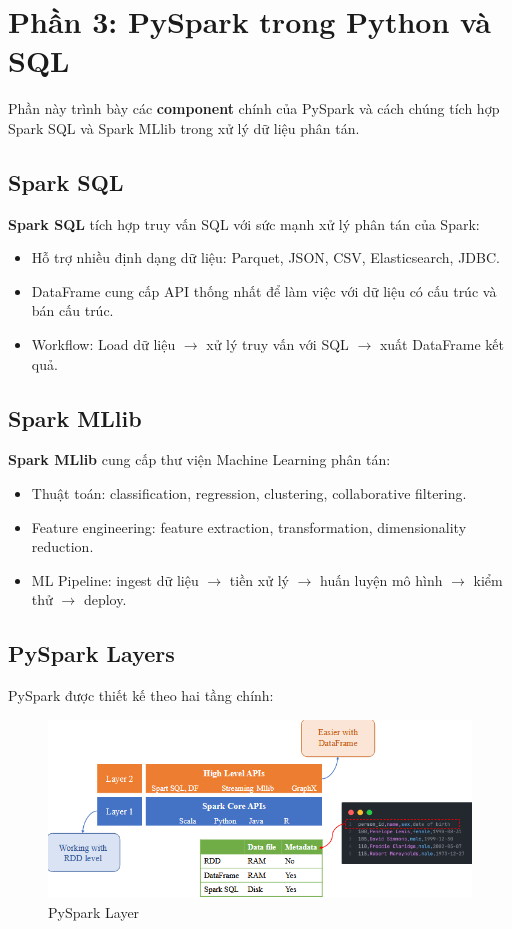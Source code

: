 \documentclass[11pt]{article}
\begin{document}
\section{Phần 3: PySpark trong Python và SQL}
Phần này trình bày các \textbf{component} chính của PySpark và cách chúng tích hợp Spark SQL và Spark MLlib trong xử lý dữ liệu phân tán.

\subsection{Spark SQL}
\textbf{Spark SQL} tích hợp truy vấn SQL với sức mạnh xử lý phân tán của Spark:
\begin{itemize}
    \item Hỗ trợ nhiều định dạng dữ liệu: Parquet, JSON, CSV, Elasticsearch, JDBC.
    \item DataFrame cung cấp API thống nhất để làm việc với dữ liệu có cấu trúc và bán cấu trúc.
    \item Workflow: Load dữ liệu $\rightarrow$ xử lý truy vấn với SQL $\rightarrow$ xuất DataFrame kết quả.
\end{itemize}

\subsection{Spark MLlib}
\textbf{Spark MLlib} cung cấp thư viện Machine Learning phân tán:
\begin{itemize}
    \item Thuật toán: classification, regression, clustering, collaborative filtering.
    \item Feature engineering: feature extraction, transformation, dimensionality reduction.
    \item ML Pipeline: ingest dữ liệu $\rightarrow$ tiền xử lý $\rightarrow$ huấn luyện mô hình $\rightarrow$ kiểm thử $\rightarrow$ deploy.
\end{itemize}

\subsection{PySpark Layers}
PySpark được thiết kế theo hai tầng chính:
\begin{figure}[H]
    \centering
    \includegraphics[width=0.65\linewidth]{images/pysparkLayer.png}
    \caption{PySpark Layer}
    \label{fig:pyspark_layer}
\end{figure}
\end{document}
